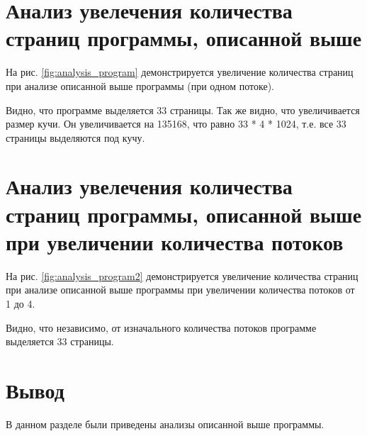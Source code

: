 \section{Анализ увелечения количества страниц программы, описанной выше}

На рис. \ref{fig:analysis_program} демонстрируется увеличение количества страниц 
при анализе описанной выше программы (при одном потоке).

Видно, что программе выделяется 33 страницы. 
Так же видно, что увеличивается размер кучи. 
Он увеличивается на 135168, что равно 33 * 4 * 1024, т.е. все 33 страницы выделяются под кучу.

\begin{figure}[ht!]
\end{figure}


\section{Анализ увелечения количества страниц программы, описанной выше при увеличении количества потоков}

На рис. \ref{fig:analysis_program2} демонстрируется увеличение количества страниц 
при анализе описанной выше программы при увеличении количества потоков от 1 до 4.

Видно, что независимо, от изначального количества потоков программе выделяется 33 страницы. 

\begin{figure}[ht!]
\end{figure}

\section{Вывод}

В данном разделе были приведены анализы описанной выше программы.
